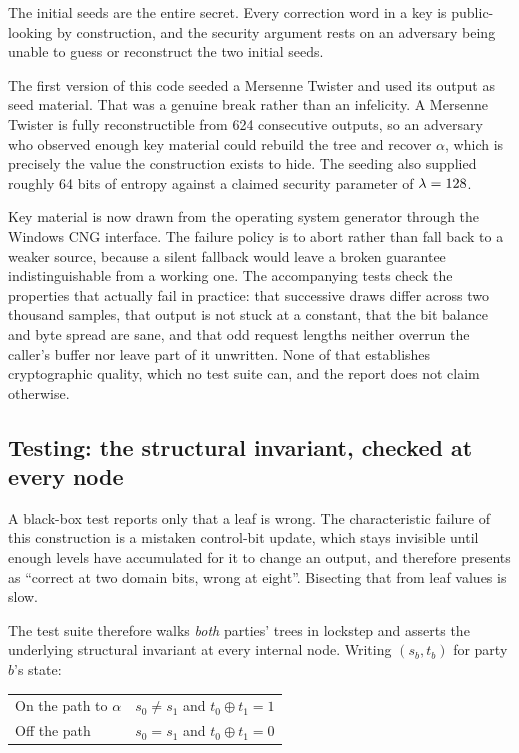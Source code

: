 The initial seeds are the entire secret. Every correction word in a key is
public-looking by construction, and the security argument rests on an
adversary being unable to guess or reconstruct the two initial seeds.

The first version of this code seeded a Mersenne Twister and used its output
as seed material. That was a genuine break rather than an infelicity. A
Mersenne Twister is fully reconstructible from 624 consecutive outputs, so an
adversary who observed enough key material could rebuild the tree and recover
$\alpha$, which is precisely the value the construction exists to hide. The
seeding also supplied roughly 64 bits of entropy against a claimed security
parameter of $\lambda = 128$.

Key material is now drawn from the operating system generator through the
Windows CNG interface. The failure policy is to abort rather than fall back to
a weaker source, because a silent fallback would leave a broken guarantee
indistinguishable from a working one. The accompanying tests check the
properties that actually fail in practice: that successive draws differ across
two thousand samples, that output is not stuck at a constant, that the bit
balance and byte spread are sane, and that odd request lengths neither overrun
the caller's buffer nor leave part of it unwritten. None of that establishes
cryptographic quality, which no test suite can, and the report does not claim
otherwise.

\subsection{Testing: the structural invariant, checked at every node}
\label{sec:tech:dpf:testing}

A black-box test reports only that a leaf is wrong. The characteristic failure
of this construction is a mistaken control-bit update, which stays invisible
until enough levels have accumulated for it to change an output, and therefore
presents as ``correct at two domain bits, wrong at eight''. Bisecting that from
leaf values is slow.

The test suite therefore walks \emph{both} parties' trees in lockstep and
asserts the underlying structural invariant at every internal node. Writing
$(s_b, t_b)$ for party $b$'s state:

\begin{center}
\begin{tabular}{@{}ll@{}}
\toprule
On the path to $\alpha$  & $s_0 \neq s_1$ and $t_0 \oplus t_1 = 1$ \\
Off the path             & $s_0 = s_1$ and $t_0 \oplus t_1 = 0$ \\
\bottomrule
\end{tabular}
\end{center}

